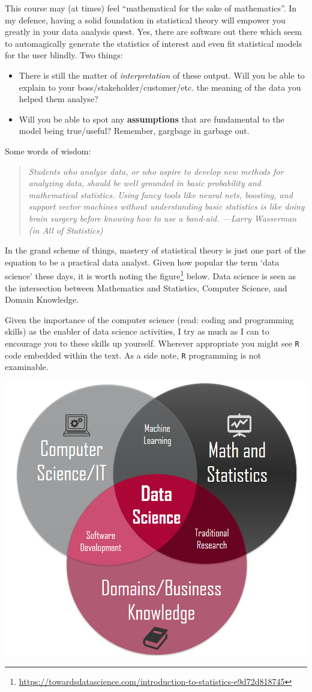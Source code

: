 \documentclass[
]{book}
\theoremstyle{definition}
\theoremstyle{definition}
\theoremstyle{definition}
\theoremstyle{definition}
\theoremstyle{remark}
\begin{document}
This course may (at times) feel ``mathematical for the sake of mathematics''. In my defence, having a solid foundation in statistical theory will empower you greatly in your data analysis quest. Yes, there are software out there which seem to automagically generate the statistics of interest and even fit statistical models for the user blindly. Two things:

\begin{itemize}
\item
  There is still the matter of \emph{interpretation} of these output. Will you be able to explain to your boss/stakeholder/customer/etc. the meaning of the data you helped them analyse?
\item
  Will you be able to spot any \textbf{assumptions} that are fundamental to the model being true/useful? Remember, gargbage in garbage out.
\end{itemize}

Some words of wisdom:

\begin{quote}
\emph{Students who analyze data, or who aspire to develop new methods for analyzing data, should be well grounded in basic probability and mathematical statistics. Using fancy tools like neural nets, boosting, and support vector machines without understanding basic statistics is like doing brain surgery before knowing how to use a band-aid. ---Larry Wasserman (in All of Statistics)}
\end{quote}

In the grand scheme of things, mastery of statistical theory is just one part of the equation to be a practical data analyst. Given how popular the term `data science' these days, it is worth noting the figure\footnote{\url{https://towardsdatascience.com/introduction-to-statistics-e9d72d818745}} below. Data science is seen as the intersection between Mathematics and Statistics, Computer Science, and Domain Knowledge.

Given the importance of the computer science (read: coding and programming skills) as the enabler of data science activities, I try as much as I can to encourage you to these skills up yourself. Wherever appropriate you might see \texttt{R} code embedded within the text. As a side note, \texttt{R} programming is not examinable.

\begin{center}\includegraphics[width=0.6\linewidth]{figure/00-ds2} \end{center}
\end{document}
